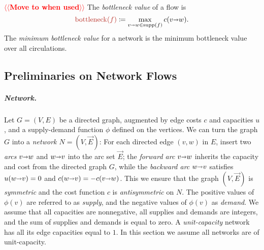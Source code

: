 \documentclass[a4paper,UKenglish]{socg-lipics-v2018}
\makeatletter
\def\fsupply{\phi}
\def\arcto{\mathord\shortrightarrow}
\def\arc#1#2{#1\arcto#2}
\def\supp{\operatorname{supp}}
\theoremstyle{plain}
\numberwithin{figure}{section}
\renewcommand{\paragraph}{\subparagraph}
\def\EMPH#1{\textcolor{BrickRed}{{\emph{#1}}}}
\def\n@te#1{\textsf{\boldmath \textbf{$\langle\!\langle$#1$\rangle\!\rangle$}}\leavevmode}
\def\note#1{\textcolor{red}{\n@te{#1}}}
\makeatother
\begin{document}
\note{Move to when used} %
The \EMPH{bottleneck value} of a flow is
\[
 \EMPH{$\operatorname{bottleneck}(f)$} \coloneqq \max_{\arc vw \in \supp(f)} c(\arc vw).
\]
The \EMPH{minimum bottleneck value} for a network is the minimum bottleneck value over all circulations.

\begin{toappendix}
\subsection{Preliminaries on Network Flows}
\label{SSA:prelim-flow}

\paragraph{Network.}
Let $G=(V,E)$ be a directed graph, augmented by edge costs $c$ and capacities $u$, and a supply-demand function $\fsupply$ defined on the vertices.
%
We can turn the graph $G$ into a \EMPH{network $N = (V, \vec{E})$}:
For each directed edge $(v,w)$ in $E$, insert two \EMPH{arcs} $\arc vw$ and $\arc wv$ into the arc set $\vec{E}$; the \EMPH{forward arc} $\arc vw$ inherits the capacity and cost from the directed graph $G$,
while the \EMPH{backward arc} $\arc wv$ satisfies $u(\arc wv) = 0$ and $c(\arc wv) = -c(\arc vw)$.  This we ensure that the graph $(V,\vec{E})$ is \emph{symmetric} and the cost function $c$ is \emph{antisymmetric} on $N$.
%
The positive values of $\fsupply(v)$ are referred to as \EMPH{supply}, and the negative values of $\fsupply(v)$ as \EMPH{demand}.
We assume that all capacities are nonnegative, all supplies and demands are integers, and the sum of supplies and demands is equal to zero.
%
A \EMPH{unit-capacity} network has all its edge capacities equal to $1$.
In this section we assume all networks are of unit-capacity.


\end{toappendix}
\end{document}
